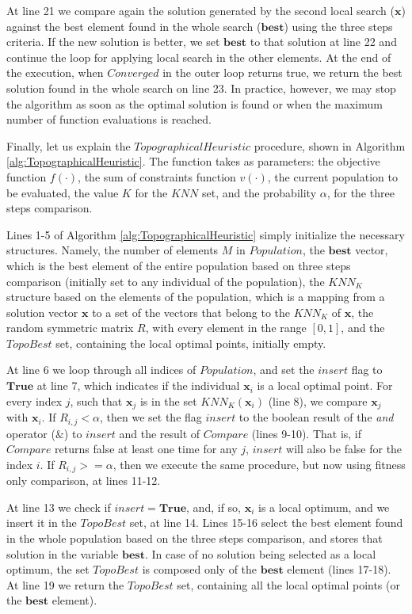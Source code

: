 At line 21 we compare again the solution generated by the second local search ($\bm{x}$) against the best element found in the whole search ($\bm{best}$) using the three steps criteria. If the new solution is better, we set $\bm{best}$ to that solution at line 22 and continue the loop for applying local search in the other elements. At the end of the execution, when $Converged$ in the outer loop returns true, we return the best solution found in the whole search on line 23. In practice, however, we may stop the algorithm as soon as the optimal solution is found or when the maximum number of function evaluations is reached.

Finally, let us explain the $TopographicalHeuristic$ procedure, shown in Algorithm \ref{alg:TopographicalHeuristic}. The function takes as parameters: the objective function $f(\cdot)$, the sum of constraints function $v(\cdot)$, the current population to be evaluated, the value $K$ for the $KNN$ set, and the probability $\alpha$, for the three steps comparison.





Lines 1-5 of Algorithm \ref{alg:TopographicalHeuristic} simply initialize the necessary structures. Namely, the number of elements $M$ in $Population$, the $\bm{best}$ vector, which is the best element of the entire population based on three steps comparison (initially set to any individual of the population), the $KNN_K$ structure based on the elements of the population, which is a mapping from a solution vector $\bm{x}$ to a set of the vectors that belong to the $KNN_K$ of $\bm{x}$, the random symmetric matrix $R$, with every element in the range $[0, 1]$, and the $TopoBest$ set, containing the local optimal points, initially empty.

At line 6 we loop through all indices of $Population$, and set the $insert$ flag to $\bm{True}$ at line 7, which indicates if the individual $\bm{x}_i$ is a local optimal point. For every index $j$, such that $\bm{x}_j$ is in the set $KNN_K(\bm{x}_i)$ (line 8), we compare $\bm{x}_j$ with $\bm{x}_i$. If $R_{i, j} < \alpha$, then we set the flag $insert$ to the boolean result of the \textit{and} operator ($\&$) to $insert$ and the result of $Compare$ (lines 9-10). That is, if $Compare$ returns false at least one time for any $j$, $insert$ will also be false for the index $i$. If $R_{i, j} >= \alpha$, then we execute the same procedure, but now using fitness only comparison, at lines 11-12.

At line 13 we check if $insert = \bm{True}$, and, if so, $\bm{x}_i$ is a local optimum, and we insert it in the $TopoBest$ set, at line 14. Lines 15-16 select the best element found in the whole population based on the three steps comparison, and stores that solution in the variable $\bm{best}$. In case of no solution being selected as a local optimum, the set $TopoBest$ is composed only of the $\bm{best}$ element (lines 17-18). At line 19 we return the $TopoBest$ set, containing all the local optimal points (or the $\bm{best}$ element).


